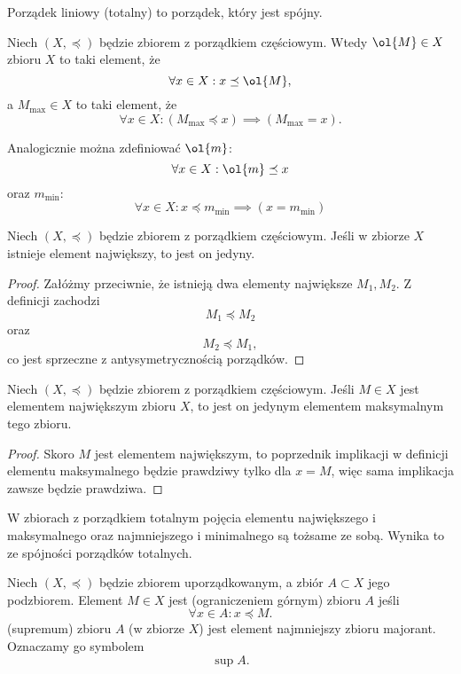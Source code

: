\begin{definition}
    Porządek liniowy (totalny) to porządek, który jest spójny.
\end{definition}

Niech $(X, \preceq)$ będzie zbiorem z porządkiem częściowym. Wtedy  $\ol{M} \in X$ zbioru $X$ to taki element, że
$$ \forall x \in X : x \preceq \ol{M}, $$
a  $M_{\max} \in X$ to taki element, że
$$ \forall x \in X : (M_{\max} \preceq x) \implies (M_{\max} = x). $$

\begin{remark}
    Analogicznie można zdefiniować  $\ol{m}$:
    $$ \forall x \in X : \ol{m} \preceq x $$
    oraz  $m_{\min}$:
    $$ \forall x \in X : x \preceq m_{\min} \implies (x = m_{\min}) $$
\end{remark}

\begin{theorem}
    \label{t:uniq_greatest}
    Niech $(X, \preceq)$ będzie zbiorem z porządkiem częściowym. Jeśli w zbiorze $X$ istnieje element największy, to jest on jedyny.
\end{theorem}
\begin{proof}
    Załóżmy przeciwnie, że istnieją dwa elementy największe $M_1, M_2$. Z definicji zachodzi
    $$ M_1 \preceq M_2 $$
    oraz
    $$ M_2 \preceq M_1, $$
    co jest sprzeczne z antysymetrycznością porządków.
\end{proof}

\begin{theorem}
    Niech $(X, \preceq)$ będzie zbiorem z porządkiem częściowym. Jeśli $M \in X$ jest elementem największym zbioru $X$, to jest on jedynym elementem maksymalnym tego zbioru.
\end{theorem}
\begin{proof}
    Skoro $M$ jest elementem największym, to poprzednik implikacji w definicji elementu maksymalnego będzie prawdziwy tylko dla $x = M$, więc sama implikacja zawsze będzie prawdziwa.
\end{proof}

\begin{fact}
    \label{f:greatest=maximal}
    W zbiorach z porządkiem totalnym pojęcia elementu największego i maksymalnego oraz najmniejszego i minimalnego są tożsame ze sobą. Wynika to ze spójności porządków totalnych.
\end{fact}

Niech $(X, \preceq)$ będzie zbiorem uporządkowanym, a zbiór $A \subset X$ jego podzbiorem. Element $M \in X$ jest  (ograniczeniem górnym) zbioru $A$ jeśli
$$ \forall x \in A : x \preceq M. $$
 (supremum) zbioru $A$ (w zbiorze $X$) jest element najmniejszy zbioru majorant. Oznaczamy go symbolem $$\sup A.$$

